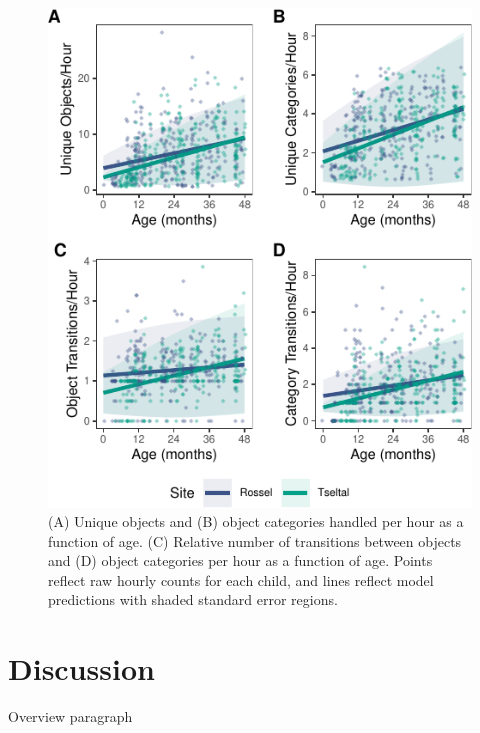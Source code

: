 \documentclass[10pt, letterpaper]{article}
\newenvironment{CodeChunk}{}{}
\begin{document}
\begin{CodeChunk}
\begin{figure}[!ht]

{\centering \includegraphics{figs/age-effects-fig-1} 

}

\caption[(A) Unique objects and (B) object categories handled per hour as a function of age]{(A) Unique objects and (B) object categories handled per hour as a function of age. (C) Relative number of transitions between objects and (D) object categories per hour as a function of age. Points reflect raw hourly counts for each child, and lines reflect model predictions with shaded standard error regions.}\label{fig:age-effects-fig}
\end{figure}
\end{CodeChunk}

\hypertarget{discussion}{%
\section{Discussion}\label{discussion}}

Overview paragraph
\end{document}

